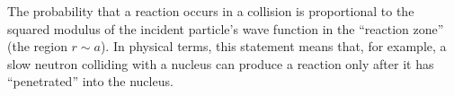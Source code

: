 The probability that a reaction occurs in a collision is proportional to the squared modulus of the incident particle's wave function in the ``reaction zone'' (the region $r\sim a$). In physical terms, this statement means that, for example, a slow neutron colliding with a nucleus can produce a reaction only after it has ``penetrated'' into the nucleus.
